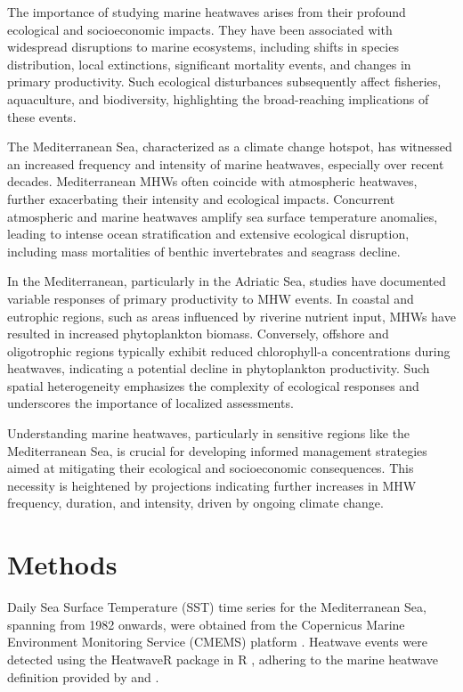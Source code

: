 \documentclass[
  number]{elsarticle}
\begin{document}
The importance of studying marine heatwaves arises from their profound
ecological and socioeconomic impacts. They have been associated with
widespread disruptions to marine ecosystems, including shifts in species
distribution, local extinctions, significant mortality events, and
changes in primary productivity. Such ecological disturbances
subsequently affect fisheries, aquaculture, and biodiversity,
highlighting the broad-reaching implications of these events.

The Mediterranean Sea, characterized as a climate change hotspot, has
witnessed an increased frequency and intensity of marine heatwaves,
especially over recent decades. Mediterranean MHWs often coincide with
atmospheric heatwaves, further exacerbating their intensity and
ecological impacts. Concurrent atmospheric and marine heatwaves amplify
sea surface temperature anomalies, leading to intense ocean
stratification and extensive ecological disruption, including mass
mortalities of benthic invertebrates and seagrass decline.

In the Mediterranean, particularly in the Adriatic Sea, studies have
documented variable responses of primary productivity to MHW events. In
coastal and eutrophic regions, such as areas influenced by riverine
nutrient input, MHWs have resulted in increased phytoplankton biomass.
Conversely, offshore and oligotrophic regions typically exhibit reduced
chlorophyll-a concentrations during heatwaves, indicating a potential
decline in phytoplankton productivity. Such spatial heterogeneity
emphasizes the complexity of ecological responses and underscores the
importance of localized assessments.

Understanding marine heatwaves, particularly in sensitive regions like
the Mediterranean Sea, is crucial for developing informed management
strategies aimed at mitigating their ecological and socioeconomic
consequences. This necessity is heightened by projections indicating
further increases in MHW frequency, duration, and intensity, driven by
ongoing climate change.

\section{Methods}\label{methods}

Daily Sea Surface Temperature (SST) time series for the Mediterranean
Sea, spanning from 1982 onwards, were obtained from the Copernicus
Marine Environment Monitoring Service (CMEMS) platform
\citep{Copernicus_Sentinel, pisano2016new, embury2024satellite}.
Heatwave events were detected using the HeatwaveR package in R
\citep{heatwaveR}, adhering to the marine heatwave definition provided
by \citep{hobday2016hierarchical} and \citep{hobday2018categorizing}.
\end{document}
